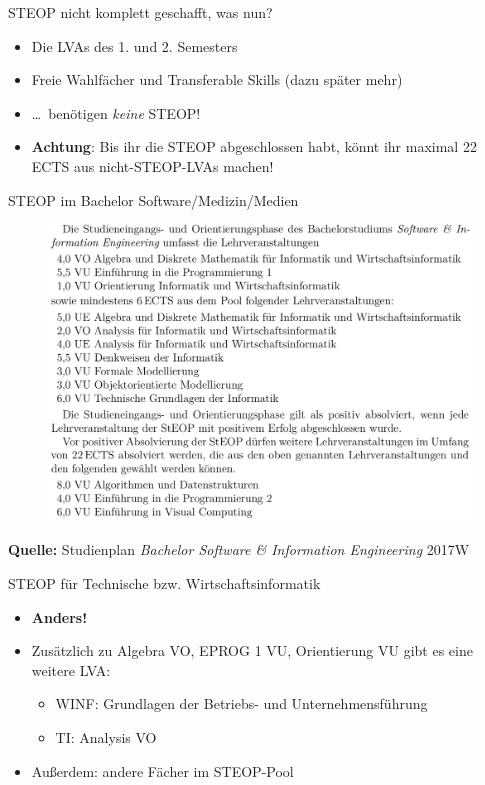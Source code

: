 \documentclass{beamer}
\begin{document}
\begin{frame}{STEOP nicht komplett geschafft, was nun?}
    \begin{itemize}
        \item Die LVAs des 1. und 2. Semesters
        \item Freie Wahlfächer und Transferable Skills (dazu später mehr)
        \item \ldots\ benötigen \textit{keine} STEOP!
        \item \textbf{Achtung}: Bis ihr die STEOP abgeschlossen habt,
        könnt ihr maximal 22 ECTS aus nicht-STEOP-LVAs machen!
    \end{itemize}
\end{frame}

\begin{frame}{STEOP im Bachelor Software/Medizin/Medien}
    \begin{figure}[htp]
        \centering
        \includegraphics[width=1\textwidth]{steop.png}
    \end{figure}
    \tiny \textbf{Quelle:} Studienplan \textit{Bachelor Software \&
        Information Engineering} 2017W
\end{frame}

\begin{frame}{STEOP für Technische bzw. Wirtschaftsinformatik}
    \begin{itemize}
        \item \textbf{Anders!}
        \item Zusätzlich zu Algebra VO, EPROG 1 VU, Orientierung VU gibt es
            eine weitere LVA:
        \begin{itemize}
            \item WINF: Grundlagen der Betriebs- und Unternehmensführung
            \item TI: Analysis VO
        \end{itemize}
        \item Außerdem: andere Fächer im STEOP-Pool
    \end{itemize}
\end{frame}
\end{document}
